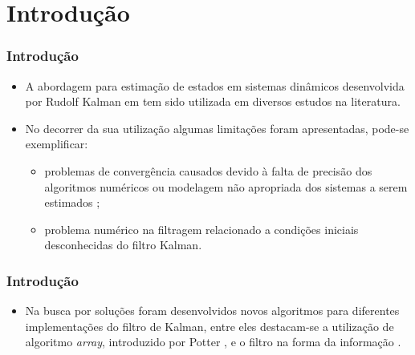 \section{Introdução}

\begin{frame}
	\frametitle{Introdução}
	\begin{itemize}
		\item A abordagem para estimação de estados em sistemas dinâmicos desenvolvida por Rudolf Kalman em \cite{Kalman1960} tem sido utilizada em diversos estudos na literatura.
		\item No decorrer da sua utilização algumas limitações foram apresentadas, pode-se exemplificar:
		\begin{itemize}
			\item problemas de convergência causados devido à falta de precisão dos algoritmos numéricos ou modelagem não apropriada dos sistemas a serem estimados \cite{Jesus2007};
			\item problema numérico na filtragem relacionado a condições iniciais desconhecidas do filtro Kalman.
		\end{itemize}
	\end{itemize}
\end{frame}

\begin{frame}
	\frametitle{Introdução}
	\begin{itemize}
		\item Na busca por soluções foram desenvolvidos novos algoritmos para diferentes implementações do filtro de Kalman, entre eles destacam-se a utilização de algoritmo \textit{array}, introduzido por Potter \cite{POTTER1963}, e o filtro na forma da informação \cite{Anderson1979}.
	\end{itemize}
\end{frame}